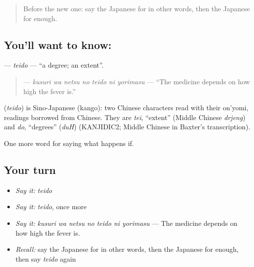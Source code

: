 \label{lesson:JA-C367-teido}



\begin{quote}
Before the new one: say the Japanese for in other words, then the Japanese for enough.
\end{quote}

\subsection*{You'll want to know: }
\textbf{} — \emph{teido} — \textquotedblleft{}a degree; an extent\textquotedblright{}.

\begin{quote}
\textbf{   } — \emph{kusuri wa netsu no teido ni yorimasu} — \textquotedblleft{}The medicine depends on how high the fever is.\textquotedblright{}
\end{quote}

\begin{cousinweb}
\textbf{} (\emph{teido}) is Sino-Japanese (kango): two Chinese characters read with their on'yomi, readings borrowed from Chinese. They are \emph{tei}, \textquotedblleft{}extent\textquotedblright{} (Middle Chinese \emph{drjeng}) and \emph{do}, \textquotedblleft{}degrees\textquotedblright{} (\emph{duH}) (KANJIDIC2; Middle Chinese in Baxter's transcription).
\end{cousinweb}

\begin{grammarlens}[title={What you've built}]
One more word for saying what happens if.
\end{grammarlens}

\subsection*{Your turn}
\begin{itemize}
\raggedright
  \item \emph{Say it:} \emph{teido}
  \item \emph{Say it:} \emph{teido}, once more
  \item \emph{Say it:} \emph{kusuri wa netsu no teido ni yorimasu} — The medicine depends on how high the fever is.
  \item \emph{Recall:} say the Japanese for in other words, then the Japanese for enough, then say \emph{teido} again
\end{itemize}


